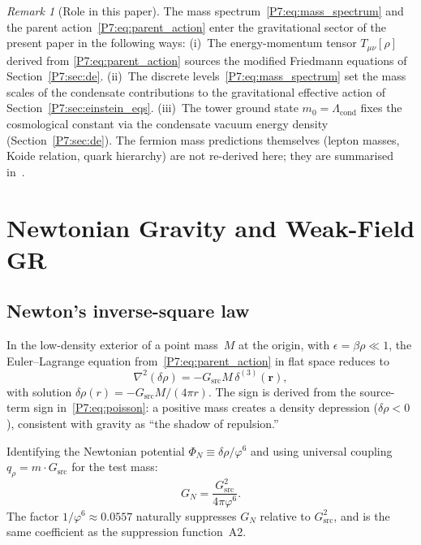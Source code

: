 \documentclass[11pt,a4paper]{article}
\theoremstyle{definition}
\theoremstyle{remark}
\newtheorem{remark}[theorem]{Remark}
\newcommand{\vp}{\varphi}
\newcommand{\Lcond}{\Lambda_{\mathrm{cond}}}
\begin{document}
\begin{remark}[Role in this paper]
\label{P7:rem:role_in_paper}
The mass spectrum~\eqref{P7:eq:mass_spectrum} and the parent
action~\eqref{P7:eq:parent_action} enter the gravitational sector of the
present paper in the following ways:
(i)~The energy-momentum tensor $T_{\mu\nu}[\rho]$ derived from
\eqref{P7:eq:parent_action} sources the modified Friedmann equations of
Section~\ref{P7:sec:de}.
(ii)~The discrete levels~\eqref{P7:eq:mass_spectrum} set the mass scales
of the condensate contributions to the gravitational effective action
of Section~\ref{P7:sec:einstein_eqs}.
(iii)~The tower ground state $m_0 = \Lcond$ fixes the cosmological
constant via the condensate vacuum energy density
(Section~\ref{P7:sec:de}).
The fermion mass predictions themselves (lepton masses, Koide relation,
quark hierarchy) are not re-derived here; they are summarised
in~\cite{Paper1,Paper4,Paper6,Koide1983}.
\end{remark}

\section{Newtonian Gravity and Weak-Field GR}
\label{P7:sec:gravity}

\subsection{Newton's inverse-square law}

In the low-density exterior of a point mass~$M$ at the origin, with
$\epsilon=\beta\rho\ll1$, the Euler--Lagrange equation from~\eqref{P7:eq:parent_action}
in flat space reduces to
\begin{equation}
  \nabla^2(\delta\rho) = -G_{\mathrm{src}}M\,\delta^{(3)}(\mathbf{r}),
  \label{P7:eq:poisson}
\end{equation}
with solution $\delta\rho(r)=-G_{\mathrm{src}}M/(4\pi r)$.
The sign is derived from the source-term sign in~\eqref{P7:eq:poisson}:
a positive mass creates a density depression ($\delta\rho<0$), consistent
with gravity as ``the shadow of repulsion.''

Identifying the Newtonian potential $\Phi_N\equiv\delta\rho/\vp^6$
and using universal coupling $q_\rho=m\cdot G_{\mathrm{src}}$ for the
test mass:
\begin{equation}
  G_N = \frac{G_{\mathrm{src}}^2}{4\pi\vp^6}.
  \label{P7:eq:GN}
\end{equation}
The factor $1/\vp^6\approx0.0557$ naturally suppresses $G_N$ relative
to $G_{\mathrm{src}}^2$, and is the same coefficient as the suppression
function~A2.
\end{document}
